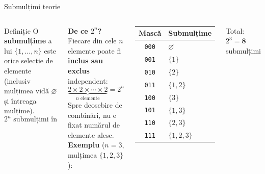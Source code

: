 ﻿\documentclass[10pt]{beamer}
\begin{document}
\begin{frame}{Submulțimi \textemdash{} teorie}
  \begin{columns}[T]
  \begin{block}{Definiție}
    O \textbf{submulțime} a lui $\{1,\ldots,n\}$ este orice selecție de
    elemente (inclusiv mulțimea vidă $\varnothing$ și întreaga mulțime).
    $$2^n \text{ submulțimi în total}$$
  \end{block}
  \smallskip
  \textbf{De ce $2^n$?} Fiecare din cele $n$ elemente poate fi
  \textbf{inclus sau exclus} independent:
  $$\underbrace{2 \times 2 \times \cdots \times 2}_{n \text{ elemente}} = 2^n$$
  Spre deosebire de combinări, nu e fixat numărul de elemente alese.
  \textbf{Exemplu} ($n=3$, mulțimea $\{1,2,3\}$):
  \smallskip
  \begin{center}
  \begin{tabular}{cl}
    \toprule
    Mască & Submulțime \\
    \midrule
    \texttt{000} & $\varnothing$ \\
    \texttt{001} & $\{1\}$ \\
    \texttt{010} & $\{2\}$ \\
    \texttt{011} & $\{1,2\}$ \\
    \texttt{100} & $\{3\}$ \\
    \texttt{101} & $\{1,3\}$ \\
    \texttt{110} & $\{2,3\}$ \\
    \texttt{111} & $\{1,2,3\}$ \\
    \bottomrule
  \end{tabular}
  \end{center}
  Total: $2^3 = \mathbf{8}$ submulțimi
  \end{columns}
\end{frame}
\end{document}
